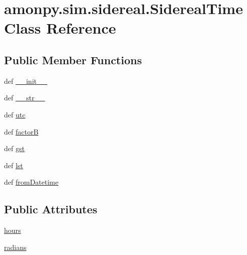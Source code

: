 \hypertarget{classamonpy_1_1sim_1_1sidereal_1_1_sidereal_time}{\section{amonpy.\-sim.\-sidereal.\-Sidereal\-Time Class Reference}
\label{classamonpy_1_1sim_1_1sidereal_1_1_sidereal_time}
}
\subsection*{Public Member Functions}
\begin{DoxyCompactItemize}
\item 
def \hyperlink{classamonpy_1_1sim_1_1sidereal_1_1_sidereal_time_a285c318199b672e5052bb39fbd00d2d6}{\-\_\-\-\_\-init\-\_\-\-\_\-}
\item 
def \hyperlink{classamonpy_1_1sim_1_1sidereal_1_1_sidereal_time_ab51f970daf005f063da6ed050e762e6f}{\-\_\-\-\_\-str\-\_\-\-\_\-}
\item 
def \hyperlink{classamonpy_1_1sim_1_1sidereal_1_1_sidereal_time_aac93caa6455fe317974bb52365cbf319}{utc}
\item 
def \hyperlink{classamonpy_1_1sim_1_1sidereal_1_1_sidereal_time_a003f64f0eafbc29c051c0827719d5b19}{factor\-B}
\item 
def \hyperlink{classamonpy_1_1sim_1_1sidereal_1_1_sidereal_time_a511c12704367c6294d25d04a788940ec}{gst}
\item 
def \hyperlink{classamonpy_1_1sim_1_1sidereal_1_1_sidereal_time_a464463af7811e8c98fd1d7cb8faf8c6a}{lst}
\item 
def \hyperlink{classamonpy_1_1sim_1_1sidereal_1_1_sidereal_time_a70159aae7ac5de0e1044fe3f3f99bb56}{from\-Datetime}
\end{DoxyCompactItemize}
\subsection*{Public Attributes}
\begin{DoxyCompactItemize}
\item 
\hyperlink{classamonpy_1_1sim_1_1sidereal_1_1_sidereal_time_abe5bcf1b3b0e8d9e408218bee8c705f1}{hours}
\item 
\hyperlink{classamonpy_1_1sim_1_1sidereal_1_1_sidereal_time_a4386e1bed24a417f462c060e9ade62f7}{radians}
\end{DoxyCompactItemize}
